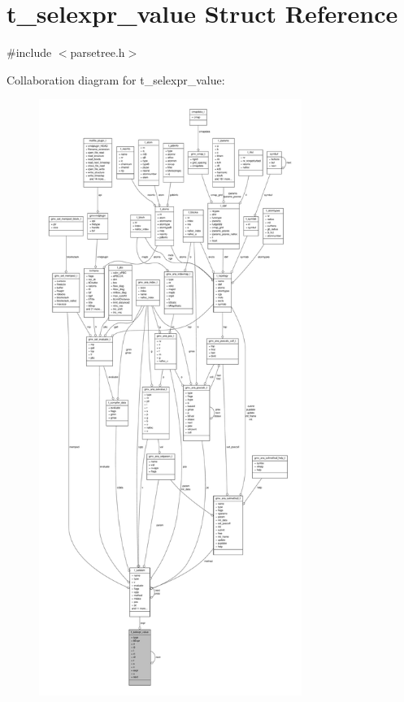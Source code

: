 \hypertarget{structt__selexpr__value}{\section{t\-\_\-selexpr\-\_\-value \-Struct \-Reference}
\label{structt__selexpr__value}
}


{\ttfamily \#include $<$parsetree.\-h$>$}



\-Collaboration diagram for t\-\_\-selexpr\-\_\-value\-:
\nopagebreak
\begin{figure}[H]
\begin{center}
\leavevmode
\includegraphics[height=550pt]{structt__selexpr__value__coll__graph}
\end{center}
\end{figure}

